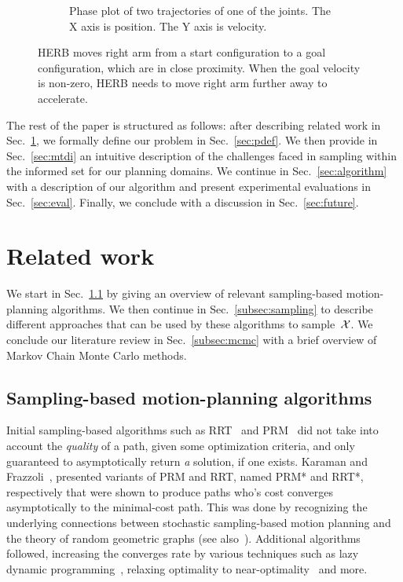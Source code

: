 \documentclass[letterpaper, 10 pt, conference]{ieeeconf}  %
\begin{document}
\begin{figure}[t!]
\begin{minipage}[t]{0.35\linewidth}
\begin{subfigure}[c]{\textwidth}
    		\caption{Phase plot of two trajectories of one of the joints.
    		The X axis is position. The Y axis is velocity. }
    		\label{fig:motivation:phase_plot}
        \end{subfigure}
   	\end{minipage}
	\caption{HERB moves right arm from a start configuration to a goal configuration, which are in close proximity.
    When the goal velocity is non-zero, HERB needs to move right arm further away to accelerate.
	}
	\label{fig:motivation}
\end{figure} 

The rest of the paper is structured as follows: after describing related work in Sec.~\ref{sec:related_work}, we formally define our problem in Sec.~\ref{sec:pdef}.
We then provide in Sec.~\ref{sec:mtdi} an intuitive description of the challenges faced in sampling within the informed set for our planning domains.
We continue in Sec.~\ref{sec:algorithm} with a description of our algorithm and present experimental evaluations in Sec.~\ref{sec:eval}.
Finally, we conclude with a discussion in Sec.~\ref{sec:future}.


\section{Related work}
\label{sec:related_work}
We start in Sec.~\ref{subsec:planning} by giving an overview of relevant sampling-based motion-planning algorithms.
We then continue in Sec.~\ref{subsec:sampling} to describe different approaches that can be used by  these algorithms to sample~$\mathcal{X}$.
We conclude our literature review in Sec.~\ref{subsec:mcmc} with a brief overview of Markov Chain Monte Carlo methods.

\subsection{Sampling-based motion-planning algorithms}
\label{subsec:planning}
Initial sampling-based algorithms such as RRT~\cite{LK01} and PRM~\cite{KSLO96} did not take into account the \emph{quality} of a path, given some optimization criteria, and only guaranteed to asymptotically return \emph{a} solution, if one exists.
Karaman and Frazzoli~\cite{KF11}, presented variants of PRM and RRT, named PRM* and RRT*, respectively that were shown to produce paths who's cost converges asymptotically to the minimal-cost path.
This was done by recognizing the underlying connections between stochastic sampling-based motion planning and the theory of random geometric graphs (see also~\cite{SSH16}).
Additional algorithms followed, increasing the converges rate by various techniques such as 
lazy dynamic programming~\cite{GSB15, SH15},
relaxing optimality to near-optimality~\cite{SH16} 
and more.
\end{document}
